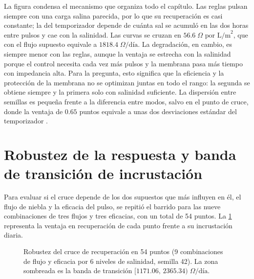 La figura condensa el mecanismo que organiza todo el cap\'itulo. Las reglas pulsan siempre con una carga salina parecida, por lo que su recuperaci\'on es casi constante; la del temporizador depende de cu\'anta sal se acumul\'o en las dos horas entre pulsos y cae con la salinidad. Las curvas se cruzan en $56.6\;\Omega\text{ por L/m}^2$, que con el flujo supuesto equivale a $1818.4\;\Omega\text{/d\'ia}$. La degradaci\'on, en cambio, es siempre menor con las reglas, aunque la ventaja se estrecha con la salinidad porque el control necesita cada vez m\'as pulsos y la membrana pasa m\'as tiempo con impedancia alta. Para la pregunta, esto significa que la eficiencia y la protecci\'on de la membrana no se optimizan juntas en todo el rango: la segunda se obtiene siempre y la primera solo con salinidad suficiente. La dispersi\'on entre semillas es peque\~na frente a la diferencia entre modos, salvo en el punto de cruce, donde la ventaja de $0.65$ puntos equivale a unas dos desviaciones est\'andar del temporizador \parencite[doc.~04, \S~7.5]{axioma2026engine}.

\section{Robustez de la respuesta y banda de transici\'on de incrustaci\'on}
\label{sec:banda}
Para evaluar si el cruce depende de los dos supuestos que m\'as influyen en \'el, el flujo de niebla y la eficacia del pulso, se repiti\'o el barrido para las nueve combinaciones de tres flujos y tres eficacias, con un total de 54 puntos. La \cref{fig:robustez_respuesta} representa la ventaja en recuperaci\'on de cada punto frente a su incrustaci\'on diaria.

\begin{figure}[htbp]
\centering

\caption{Robustez del cruce de recuperaci\'on en 54 puntos (9 combinaciones de flujo y eficacia por 6 niveles de salinidad, semilla 42). La zona sombreada es la banda de transici\'on $[1171.06,\, 2365.34)\;\Omega\text{/d\'ia}$.}
\label{fig:robustez_respuesta}
\end{figure}

